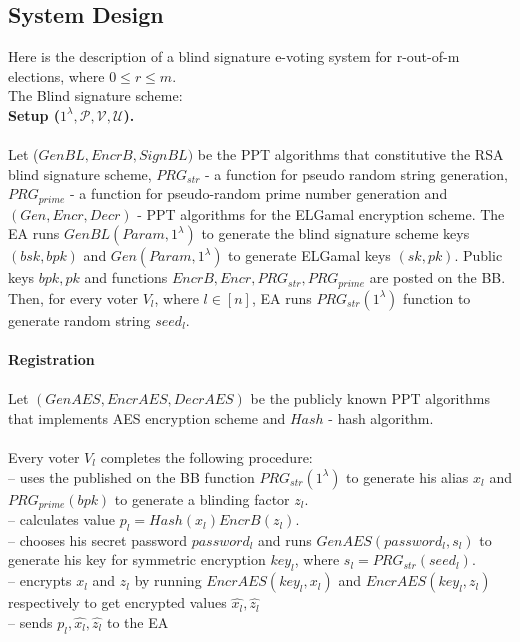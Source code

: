 \documentclass[12pt]{article}
\begin{document}
\subsection{System Design}
Here is the description of a blind signature e-voting system for r-out-of-m elections, where $0\leq r\leq m$.\\
The Blind signature scheme:\\ 
\textbf{Setup ($1^{\lambda}, \mathcal{P}, \mathcal{V}, \mathcal{U}$).}\\\\
Let ($GenBL, EncrB, SignBL)$ be the PPT algorithms that constitutive the RSA blind signature scheme,  $PRG_{str}$  - a function for pseudo random string generation, $PRG_{prime}$  - a function for pseudo-random prime number generation and $(Gen, Encr, Decr)$ - PPT algorithms for the ELGamal encryption scheme. The EA runs $GenBL(Param, 1^{\lambda})$ to generate the blind signature scheme keys $(bsk, bpk)$ and $Gen(Param, 1^{\lambda})$ to generate ELGamal keys $(sk,pk)$. Public keys $bpk,pk$ and functions $EncrB,Encr, PRG_{str}, PRG_{prime}$ are posted on the BB.\\
Then, for every voter $V_l$, where $l \in [n]$, EA runs $PRG_{str}(1^{\lambda})$ function to generate random string $seed_l$.\\\\
\textbf{Registration}\\\\
Let $(GenAES, EncrAES, DecrAES)$ be the publicly known PPT algorithms that implements AES encryption scheme and $Hash$ - hash algorithm.  \\\\
Every voter $V_l$ completes the following procedure: \\
--  uses the published on the BB function $PRG_{str}(1^{\lambda})$ to generate his alias $x_l$ and  $PRG_{prime}(bpk)$ to generate a blinding factor $z_l$. \\
-- calculates value $p_l = Hash(x_l)EncrB(z_l)$.\\
--  chooses his secret password $password_l$ and runs  $ GenAES(password_l, s_l)$ to generate his key for symmetric encryption $key_l$, where $s_l = PRG_{str}(seed_l)$.\\
--  encrypts $x_l$ and $z_l$ by running  $EncrAES(key_l,x_l)$ and $EncrAES(key_l,z_l)$ respectively to get encrypted values $\hat{x_l},\hat{z_l}$\\
-- sends $p_l,\hat{x_l},\hat{z_l}$ to the EA\\\\
\end{document}
